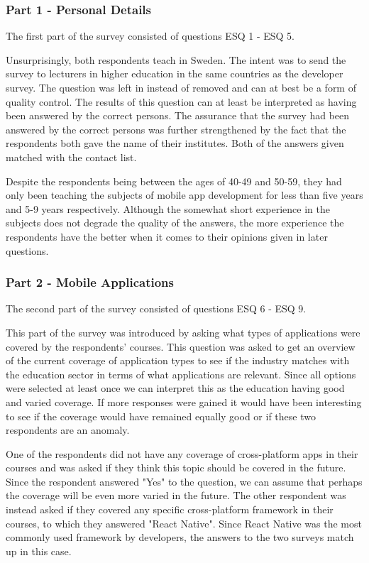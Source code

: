 \documentclass[a4paper,12pt]{article}
\begin{document}
\subsubsection{Part 1 - Personal Details}
\label{Analysis_eduSurvey_part1}
The first part of the survey consisted of questions ESQ 1 - ESQ 5.

Unsurprisingly, both respondents teach in Sweden. The intent was to send the survey to lecturers in higher education in the same countries as the developer survey. The question was left in instead of removed and can at best be a form of quality control. The results of this question can at least be interpreted as having been answered by the correct persons. The assurance that the survey had been answered by the correct persons was further strengthened by the fact that the respondents both gave the name of their institutes. Both of the answers given matched with the contact list.

Despite the respondents being between the ages of 40-49 and 50-59, they had only been teaching the subjects of mobile app development for less than five years and 5-9 years respectively. Although the somewhat short experience in the subjects does not degrade the quality of the answers, the more experience the respondents have the better when it comes to their opinions given in later questions.

\subsubsection{Part 2 - Mobile Applications}
\label{Analysis_eduSurvey_part2}
The second part of the survey consisted of questions ESQ 6 - ESQ 9.

This part of the survey was introduced by asking what types of applications were covered by the respondents' courses. This question was asked to get an overview of the current coverage of application types to see if the industry matches with the education sector in terms of what applications are relevant. Since all options were selected at least once we can interpret this as the education having good and varied coverage. If more responses were gained it would have been interesting to see if the coverage would have remained equally good or if these two respondents are an anomaly.

One of the respondents did not have any coverage of cross-platform apps in their courses and was asked if they think this topic should be covered in the future. Since the respondent answered "Yes" to the question, we can assume that perhaps the coverage will be even more varied in the future. The other respondent was instead asked if they covered any specific cross-platform framework in their courses, to which they answered "React Native". Since React Native was the most commonly used framework by developers, the answers to the two surveys match up in this case.
\end{document}
